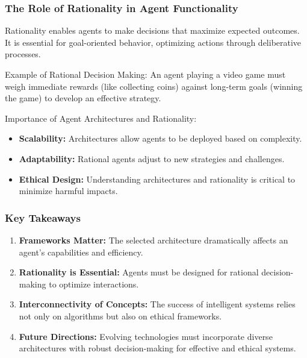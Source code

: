 \documentclass[aspectratio=169]{beamer}
\begin{document}
\begin{frame}[fragile]
    \frametitle{The Role of Rationality in Agent Functionality}
    Rationality enables agents to make decisions that maximize expected outcomes. It is essential for goal-oriented behavior, optimizing actions through deliberative processes.

    \begin{block}{Example of Rational Decision Making:}
        An agent playing a video game must weigh immediate rewards (like collecting coins) against long-term goals (winning the game) to develop an effective strategy.
    \end{block}

    \begin{block}{Importance of Agent Architectures and Rationality:}
        \begin{itemize}
            \item \textbf{Scalability:} Architectures allow agents to be deployed based on complexity.
            \item \textbf{Adaptability:} Rational agents adjust to new strategies and challenges.
            \item \textbf{Ethical Design:} Understanding architectures and rationality is critical to minimize harmful impacts.
        \end{itemize}
    \end{block}
\end{frame}

\begin{frame}[fragile]
    \frametitle{Key Takeaways}
    \begin{enumerate}
        \item \textbf{Frameworks Matter:} The selected architecture dramatically affects an agent's capabilities and efficiency.
        \item \textbf{Rationality is Essential:} Agents must be designed for rational decision-making to optimize interactions.
        \item \textbf{Interconnectivity of Concepts:} The success of intelligent systems relies not only on algorithms but also on ethical frameworks.
        \item \textbf{Future Directions:} Evolving technologies must incorporate diverse architectures with robust decision-making for effective and ethical systems.
    \end{enumerate}
\end{frame}
\end{document}
